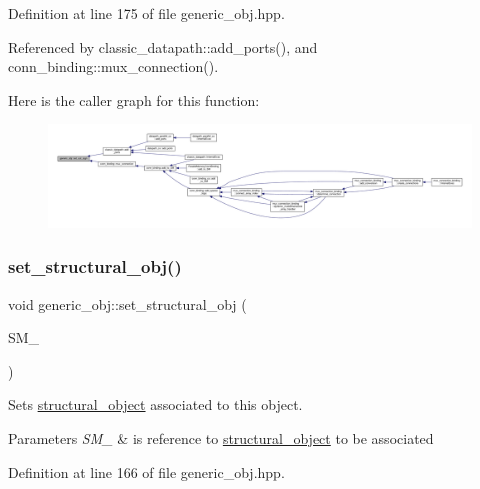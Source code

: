 Definition at line 175 of file generic\+\_\+obj.\+hpp.



Referenced by classic\+\_\+datapath\+::add\+\_\+ports(), and conn\+\_\+binding\+::mux\+\_\+connection().

Here is the caller graph for this function\+:
\nopagebreak
\begin{figure}[H]
\begin{center}
\leavevmode
\includegraphics[width=350pt]{d1/d64/classgeneric__obj_a08d8b6f56118e18065695da3d9a5b969_icgraph}
\end{center}
\end{figure}
\mbox{\label{classgeneric__obj_a89d8344e47df397e559fb8e13999d6f4}} 
\subsubsection{\texorpdfstring{set\+\_\+structural\+\_\+obj()}{set\_structural\_obj()}}
{\footnotesize\ttfamily void generic\+\_\+obj\+::set\+\_\+structural\+\_\+obj (\begin{DoxyParamCaption}\item[{const \hyperlink{structural__objects_8hpp_a8ea5f8cc50ab8f4c31e2751074ff60b2}{structural\+\_\+object\+Ref} \&}]{S\+M\+\_\+ }\end{DoxyParamCaption})\hspace{0.3cm}{\ttfamily [inline]}}



Sets \hyperlink{classstructural__object}{structural\+\_\+object} associated to this object. 


\begin{DoxyParams}{Parameters}
{\em S\+M\+\_\+} & is reference to \hyperlink{classstructural__object}{structural\+\_\+object} to be associated \\
\hline
\end{DoxyParams}


Definition at line 166 of file generic\+\_\+obj.\+hpp.



